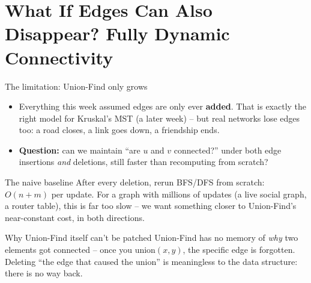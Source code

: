 \documentclass[11pt,aspectratio=169]{beamer}
\begin{document}
\section{What If Edges Can Also Disappear? Fully Dynamic Connectivity}

\begin{frame}{The limitation: Union-Find only grows}
  \begin{itemize}
    \item Everything this week assumed edges are only ever \textbf{added}. That is
    exactly the right model for Kruskal's MST (a later week) -- but real networks lose
    edges too: a road closes, a link goes down, a friendship ends.
    \item \textbf{Question:} can we maintain ``are $u$ and $v$ connected?'' under both
    edge insertions \emph{and} deletions, still faster than recomputing from scratch?
  \end{itemize}
  \begin{block}{The naive baseline}
    After every deletion, rerun BFS/DFS from scratch: $O(n+m)$ per update. For a graph
    with millions of updates (a live social graph, a router table), this is far too
    slow -- we want something closer to Union-Find's near-constant cost, in both
    directions.
  \end{block}
  \begin{exampleblock}{Why Union-Find itself can't be patched}
    Union-Find has no memory of \emph{why} two elements got connected -- once you
    union$(x,y)$, the specific edge is forgotten. Deleting ``the edge that caused the
    union'' is meaningless to the data structure: there is no way back.
  \end{exampleblock}
\end{frame}
\end{document}
